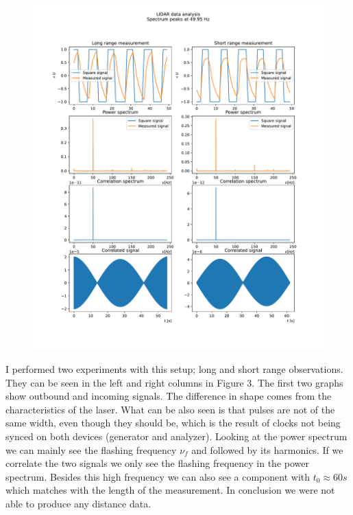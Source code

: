\documentclass[12pt, a4paper]{article}
\begin{document}
\begin{figure}[hbtp]
  \begin{center}
  \includegraphics[width=\linewidth]{graphs/lidar.pdf}
  \end{center}
  \caption{}
\end{figure}

I performed two experiments with this setup; long and short range observations. They can be seen in the left and right columns in Figure 3. The first two graphs show outbound and incoming signals. The difference in shape comes from the characteristics of the laser. What can be also seen is that pulses are not of the same width, even though they should be, which is the result of clocks not being synced on both devices (generator and analyzer). Looking at the power spectrum we can mainly see the flashing frequency $\nu_f$ and followed by its harmonics. If we correlate the two signals we only see the flashing frequency in the power spectrum. Besides this high frequency we can also see a component with $t_0 \approx 60 s$ which matches with the length of the measurement. In conclusion we were not able to produce any distance data.
\end{document}
